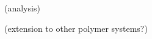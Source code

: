 \begin{activity}
\begin{model}
\end{model}

\begin{ctqs}

		\question (analysis)
			
\end{ctqs}
	


\begin{exercises}

		\exercise (extension to other polymer systems?)
\end{exercises}
	
\end{activity}